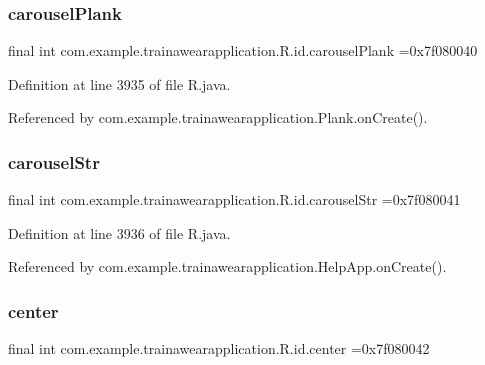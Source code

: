 \subsubsection{\texorpdfstring{carouselPlank}{carouselPlank}}
{\footnotesize\ttfamily final int com.\+example.\+trainawearapplication.\+R.\+id.\+carousel\+Plank =0x7f080040\hspace{0.3cm}{\ttfamily [static]}}



Definition at line 3935 of file R.\+java.



Referenced by com.\+example.\+trainawearapplication.\+Plank.\+on\+Create().

\mbox{\label{classcom_1_1example_1_1trainawearapplication_1_1_r_1_1id_a99899edeb6422805421067d6edc67da6}} 
\subsubsection{\texorpdfstring{carouselStr}{carouselStr}}
{\footnotesize\ttfamily final int com.\+example.\+trainawearapplication.\+R.\+id.\+carousel\+Str =0x7f080041\hspace{0.3cm}{\ttfamily [static]}}



Definition at line 3936 of file R.\+java.



Referenced by com.\+example.\+trainawearapplication.\+Help\+App.\+on\+Create().

\mbox{\label{classcom_1_1example_1_1trainawearapplication_1_1_r_1_1id_abee89826dff8a33a293fab50ce416d93}} 
\subsubsection{\texorpdfstring{center}{center}}
{\footnotesize\ttfamily final int com.\+example.\+trainawearapplication.\+R.\+id.\+center =0x7f080042\hspace{0.3cm}{\ttfamily [static]}}



